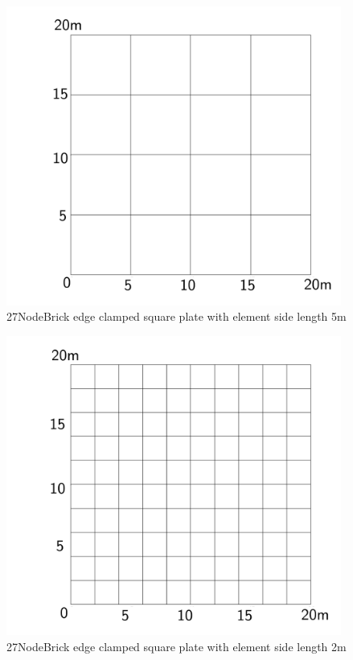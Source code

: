 \documentclass[fleqn,11pt]{article}
\begin{document}
\newpage

\begin{figure}[H]
  \centering
  \includegraphics[width=11cm]{../Figure-files/square_plate2.pdf}
  \caption{27NodeBrick edge clamped square plate with element side length 5m }
  \label{fig 27NodeBrick edges clamped square plate with element side length 5m }
\end{figure}


\begin{figure}[H]
  \centering
  \includegraphics[width=11cm]{../Figure-files/square_plate3.pdf}
  \caption{27NodeBrick edge clamped square plate with element side length 2m }
  \label{fig 27NodeBrick edges clamped square plate with element side length 2m }
\end{figure}
\end{document}
